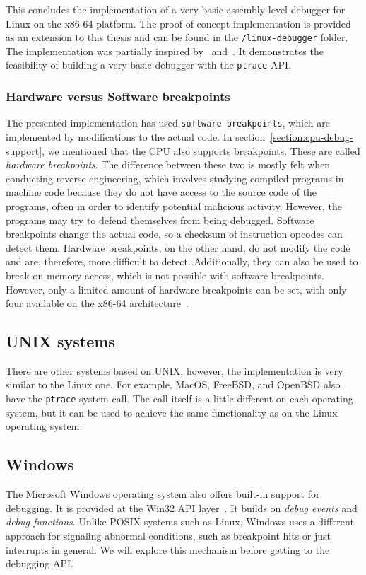 This concludes the implementation of a very basic assembly-level debugger for
Linux on the x86-64 platform. The proof of concept implementation is provided
as an extension to this thesis and can be found in the \texttt{/linux-debugger}
folder. The implementation was partially inspired by~\cite{linux-debugger-blog}
and~\cite{lldb}. It demonstrates the feasibility of building a very basic
debugger with the \texttt{ptrace} API.

\subsubsection*{Hardware versus Software breakpoints}
The presented implementation has used \texttt{software breakpoints}, which are
implemented by modifications to the actual code. In
section~\ref{section:cpu-debug-support}, we mentioned that the CPU also
supports breakpoints. These are called \textit{hardware breakpoints}. The
difference between these two is mostly felt when conducting reverse
engineering, which involves studying compiled programs in machine code because
they do not have access to the source code of the programs, often in order to
identify potential malicious activity. However, the programs may try to defend
themselves from being debugged. Software breakpoints change the actual code, so
a checksum of instruction opcodes can detect them. Hardware breakpoints, on the
other hand, do not modify the code and are, therefore, more difficult to
detect. Additionally, they can also be used to break on memory access, which is
not possible with software breakpoints. However, only a limited amount of
hardware breakpoints can be set, with only four available on the x86-64
architecture~\cite{intel-manual}.

\subsection{UNIX systems}
There are other systems based on UNIX, however, the implementation is very
similar to the Linux one. For example, MacOS, FreeBSD, and OpenBSD also have
the \texttt{ptrace} system call. The call itself is a little different on each
operating system, but it can be used to achieve the same functionality as on the
Linux operating system.

\subsection{Windows}
The Microsoft Windows operating system also offers built-in support for
debugging. It is provided at the Win32 API
layer~\cite{windows-msdn-debugging-api, windows-press-debugging-api}. It builds
on \textit{debug events} and \textit{debug functions}. Unlike POSIX systems
such as Linux, Windows uses a different approach for signaling abnormal
conditions, such as breakpoint hits or just interrupts in general. We will
explore this mechanism before getting to the debugging API.

